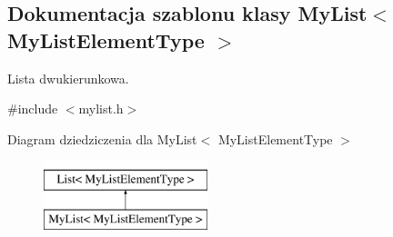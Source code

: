 \hypertarget{class_my_list}{\subsection{Dokumentacja szablonu klasy My\-List$<$ My\-List\-Element\-Type $>$}
\label{class_my_list}
}


Lista dwukierunkowa.  




{\ttfamily \#include $<$mylist.\-h$>$}

Diagram dziedziczenia dla My\-List$<$ My\-List\-Element\-Type $>$\begin{figure}[H]
\begin{center}
\leavevmode
\includegraphics[height=2.000000cm]{class_my_list}
\end{center}
\end{figure}
